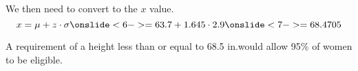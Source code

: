 \documentclass{beamer}
\begin{document}
\begin{frame}[fragile]
\begin{example}
\vspace{1mm}
We then need to convert to the $x$ value.
\vspace{-2.75mm}
\begin{equation*}
x = \mu + z\cdot\sigma
\onslide<6->
= 63.7 + 1.645\cdot 2.9 
\onslide<7->
= 68.4705
\end{equation*}

\vspace{-7.5mm}
A requirement of a height less than or equal to 68.5 in.\@ would allow 95\% of women to be eligible.
\end{example}
\end{frame}
\end{document}
